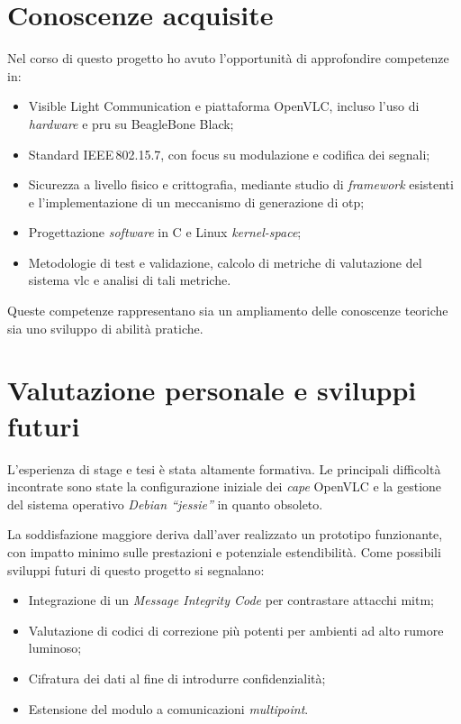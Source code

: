 \section{Conoscenze acquisite}
Nel corso di questo progetto ho avuto l'opportunità di approfondire competenze in:
\begin{itemize}
  \item Visible Light Communication e piattaforma OpenVLC, incluso l'uso di \textit{hardware} e \gls{pru} su BeagleBone Black;
  \item Standard IEEE\,802.15.7, con focus su modulazione e codifica dei segnali;
  \item Sicurezza a livello fisico e crittografia, mediante studio di \textit{framework} esistenti e l'implementazione di un meccanismo di generazione di \gls{otp};
  \item Progettazione \textit{software} in C e Linux \textit{kernel-space};
  \item Metodologie di test e validazione, calcolo di metriche di valutazione del sistema \gls{vlc} e analisi di tali metriche.
\end{itemize}
Queste competenze rappresentano sia un ampliamento delle conoscenze teoriche sia uno sviluppo di abilità pratiche.

\section{Valutazione personale e sviluppi futuri}
L'esperienza di stage e tesi è stata altamente formativa. Le principali difficoltà incontrate sono state la configurazione iniziale dei \textit{cape} OpenVLC e la gestione del sistema operativo \textit{Debian “jessie”} in quanto obsoleto.

La soddisfazione maggiore deriva dall'aver realizzato un prototipo funzionante, con impatto minimo sulle prestazioni e potenziale estendibilità. Come possibili sviluppi futuri di questo progetto si segnalano:
\begin{itemize}
  \item Integrazione di un \textit{Message Integrity Code} per contrastare attacchi \gls{mitm};
  \item Valutazione di codici di correzione più potenti per ambienti ad alto rumore luminoso;
  \item Cifratura dei dati al fine di introdurre confidenzialità;
  \item Estensione del modulo a comunicazioni \textit{multipoint}.
\end{itemize}